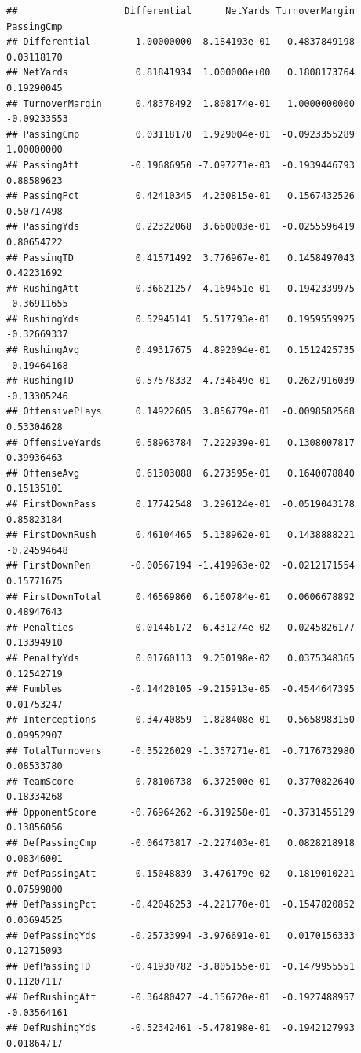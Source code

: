 \documentclass[
]{book}
\begin{document}
\begin{verbatim}
##                   Differential      NetYards TurnoverMargin  PassingCmp
## Differential        1.00000000  8.184193e-01   0.4837849198  0.03118170
## NetYards            0.81841934  1.000000e+00   0.1808173764  0.19290045
## TurnoverMargin      0.48378492  1.808174e-01   1.0000000000 -0.09233553
## PassingCmp          0.03118170  1.929004e-01  -0.0923355289  1.00000000
## PassingAtt         -0.19686950 -7.097271e-03  -0.1939446793  0.88589623
## PassingPct          0.42410345  4.230815e-01   0.1567432526  0.50717498
## PassingYds          0.22322068  3.660003e-01  -0.0255596419  0.80654722
## PassingTD           0.41571492  3.776967e-01   0.1458497043  0.42231692
## RushingAtt          0.36621257  4.169451e-01   0.1942339975 -0.36911655
## RushingYds          0.52945141  5.517793e-01   0.1959559925 -0.32669337
## RushingAvg          0.49317675  4.892094e-01   0.1512425735 -0.19464168
## RushingTD           0.57578332  4.734649e-01   0.2627916039 -0.13305246
## OffensivePlays      0.14922605  3.856779e-01  -0.0098582568  0.53304628
## OffensiveYards      0.58963784  7.222939e-01   0.1308007817  0.39936463
## OffenseAvg          0.61303088  6.273595e-01   0.1640078840  0.15135101
## FirstDownPass       0.17742548  3.296124e-01  -0.0519043178  0.85823184
## FirstDownRush       0.46104465  5.138962e-01   0.1438888221 -0.24594648
## FirstDownPen       -0.00567194 -1.419963e-02  -0.0212171554  0.15771675
## FirstDownTotal      0.46569860  6.160784e-01   0.0606678892  0.48947643
## Penalties          -0.01446172  6.431274e-02   0.0245826177  0.13394910
## PenaltyYds          0.01760113  9.250198e-02   0.0375348365  0.12542719
## Fumbles            -0.14420105 -9.215913e-05  -0.4544647395  0.01753247
## Interceptions      -0.34740859 -1.828408e-01  -0.5658983150  0.09952907
## TotalTurnovers     -0.35226029 -1.357271e-01  -0.7176732980  0.08533780
## TeamScore           0.78106738  6.372500e-01   0.3770822640  0.18334268
## OpponentScore      -0.76964262 -6.319258e-01  -0.3731455129  0.13856056
## DefPassingCmp      -0.06473817 -2.227403e-01   0.0828218918  0.08346001
## DefPassingAtt       0.15048839 -3.476179e-02   0.1819010221  0.07599800
## DefPassingPct      -0.42046253 -4.221770e-01  -0.1547820852  0.03694525
## DefPassingYds      -0.25733994 -3.976691e-01   0.0170156333  0.12715093
## DefPassingTD       -0.41930782 -3.805155e-01  -0.1479955551  0.11207117
## DefRushingAtt      -0.36480427 -4.156720e-01  -0.1927488957 -0.03564161
## DefRushingYds      -0.52342461 -5.478198e-01  -0.1942127993  0.01864717

\end{verbatim}
\end{document}
